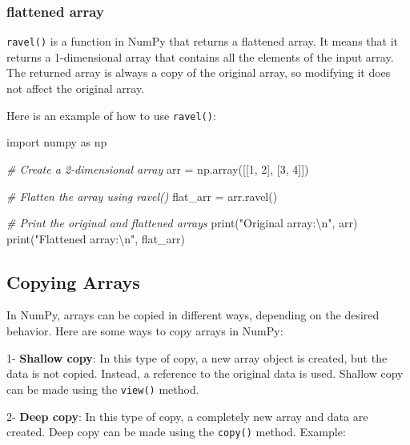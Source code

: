 \documentclass[11pt]{article}
\newenvironment{Shaded}{}{}
\newcommand{\DecValTok}[1]{\textcolor[rgb]{0.25,0.63,0.44}{{#1}}}
\newcommand{\CharTok}[1]{\textcolor[rgb]{0.25,0.44,0.63}{{#1}}}
\newcommand{\StringTok}[1]{\textcolor[rgb]{0.25,0.44,0.63}{{#1}}}
\newcommand{\CommentTok}[1]{\textcolor[rgb]{0.38,0.63,0.69}{\textit{{#1}}}}
\newcommand{\NormalTok}[1]{{#1}}
\newcommand{\ImportTok}[1]{{#1}}
\newcommand{\OperatorTok}[1]{\textcolor[rgb]{0.40,0.40,0.40}{{#1}}}
\newcommand{\BuiltInTok}[1]{{#1}}
\begin{document}
\hypertarget{flattened-array}{%
\subsubsection{flattened array}\label{flattened-array}}

\texttt{ravel()} is a function in NumPy that returns a flattened array.
It means that it returns a 1-dimensional array that contains all the
elements of the input array. The returned array is always a copy of the
original array, so modifying it does not affect the original array.

Here is an example of how to use \texttt{ravel()}:

\begin{Shaded}
\begin{Highlighting}[]
\ImportTok{import}\NormalTok{ numpy }\ImportTok{as}\NormalTok{ np}

\CommentTok{\# Create a 2{-}dimensional array}
\NormalTok{arr }\OperatorTok{=}\NormalTok{ np.array([[}\DecValTok{1}\NormalTok{, }\DecValTok{2}\NormalTok{], [}\DecValTok{3}\NormalTok{, }\DecValTok{4}\NormalTok{]])}

\CommentTok{\# Flatten the array using ravel()}
\NormalTok{flat\_arr }\OperatorTok{=}\NormalTok{ arr.ravel()}

\CommentTok{\# Print the original and flattened arrays}
\BuiltInTok{print}\NormalTok{(}\StringTok{"Original array:}\CharTok{\textbackslash{}n}\StringTok{"}\NormalTok{, arr)}
\BuiltInTok{print}\NormalTok{(}\StringTok{"Flattened array:}\CharTok{\textbackslash{}n}\StringTok{"}\NormalTok{, flat\_arr)}
\end{Highlighting}
\end{Shaded}

\hypertarget{copying-arrays}{%
\subsection{Copying Arrays}\label{copying-arrays}}

In NumPy, arrays can be copied in different ways, depending on the
desired behavior. Here are some ways to copy arrays in NumPy:

1- \textbf{Shallow copy}: In this type of copy, a new array object is
created, but the data is not copied. Instead, a reference to the
original data is used. Shallow copy can be made using the
\texttt{view()} method.

2- \textbf{Deep copy}: In this type of copy, a completely new array and
data are created. Deep copy can be made using the \texttt{copy()}
method. Example:
\end{document}
